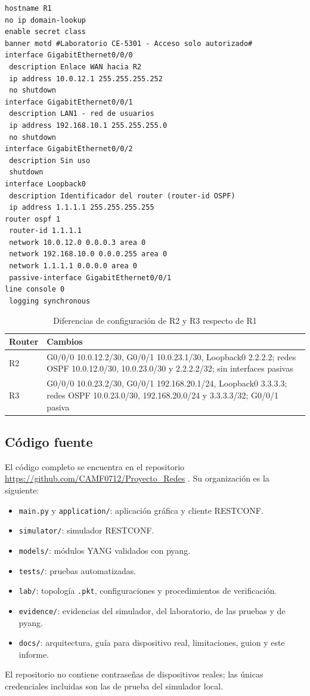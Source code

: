 \begin{lstlisting}[language={},caption={Configuración de R1},label={lst:r1cfg}]
hostname R1
no ip domain-lookup
enable secret class
banner motd #Laboratorio CE-5301 - Acceso solo autorizado#
interface GigabitEthernet0/0/0
 description Enlace WAN hacia R2
 ip address 10.0.12.1 255.255.255.252
 no shutdown
interface GigabitEthernet0/0/1
 description LAN1 - red de usuarios
 ip address 192.168.10.1 255.255.255.0
 no shutdown
interface GigabitEthernet0/0/2
 description Sin uso
 shutdown
interface Loopback0
 description Identificador del router (router-id OSPF)
 ip address 1.1.1.1 255.255.255.255
router ospf 1
 router-id 1.1.1.1
 network 10.0.12.0 0.0.0.3 area 0
 network 192.168.10.0 0.0.0.255 area 0
 network 1.1.1.1 0.0.0.0 area 0
 passive-interface GigabitEthernet0/0/1
line console 0
 logging synchronous
\end{lstlisting}

\begin{table}[H]
\centering
\caption{Diferencias de configuración de R2 y R3 respecto de R1}
\begin{tabularx}{\textwidth}{p{1.3cm}X}
\toprule
\textbf{Router} & \textbf{Cambios} \\
\midrule
R2 & G0/0/0 10.0.12.2/30, G0/0/1 10.0.23.1/30, Loopback0 2.2.2.2; redes OSPF 10.0.12.0/30, 10.0.23.0/30 y 2.2.2.2/32; sin interfaces pasivas \\
R3 & G0/0/0 10.0.23.2/30, G0/0/1 192.168.20.1/24, Loopback0 3.3.3.3; redes OSPF 10.0.23.0/30, 192.168.20.0/24 y 3.3.3.3/32; G0/0/1 pasiva \\
\bottomrule
\end{tabularx}
\end{table}

\subsection{Código fuente}
El código completo se encuentra en el repositorio \url{https://github.com/CAMF0712/Proyecto_Redes} \parencite{repositorio}. Su organización es la siguiente:
\begin{itemize}
  \item \texttt{main.py} y \texttt{application/}: aplicación gráfica y cliente RESTCONF.
  \item \texttt{simulator/}: simulador RESTCONF.
  \item \texttt{models/}: módulos YANG validados con pyang.
  \item \texttt{tests/}: pruebas automatizadas.
  \item \texttt{lab/}: topología \texttt{.pkt}, configuraciones y procedimientos de verificación.
  \item \texttt{evidence/}: evidencias del simulador, del laboratorio, de las pruebas y de pyang.
  \item \texttt{docs/}: arquitectura, guía para dispositivo real, limitaciones, guion y este informe.
\end{itemize}
El repositorio no contiene contraseñas de dispositivos reales; las únicas credenciales incluidas son las de prueba del simulador local.

